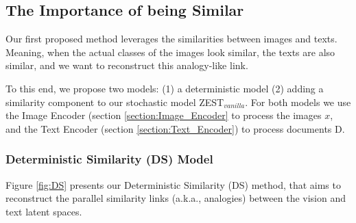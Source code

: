 \documentclass[11pt,a4paper]{article}
\begin{document}
\subsection{The Importance of being Similar}


Our first proposed method leverages the similarities between images and texts. Meaning, when the actual classes of the images look similar, the texts are also similar,
and we want to reconstruct this analogy-like link.


 To this end, we propose two models: (1) a deterministic model (2) adding a similarity component to our stochastic model ZEST$_{vanilla}$.
For both models we use the Image Encoder (section \ref{section:Image_Encoder} to process the images $x$, and the Text Encoder (section \ref{section:Text_Encoder}) to process documents D.

\subsubsection{Deterministic Similarity (DS) Model}

Figure \ref{fig:DS} presents our Deterministic Similarity (DS) method, that aims to  reconstruct  the parallel similarity links (a.k.a., analogies) between the  vision and text latent spaces. 

\end{document}
